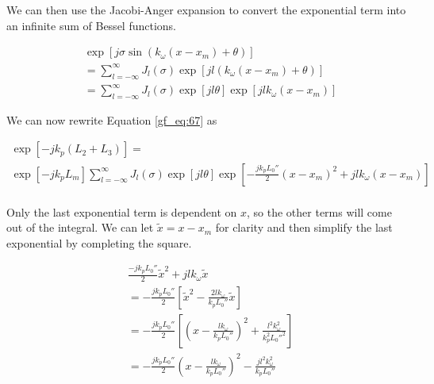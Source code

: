 We can then use the Jacobi-Anger expansion \cite{gbur_math} to convert the exponential term into an infinite sum of Bessel functions.

\begin{equation}
\begin{aligned}
& \exp\left[j\sigma \sin\left(k_{\omega} (x-x_m) + \theta\right) \right] \\ &=\sum_{l=-\infty}^{\infty}J_l(\sigma)\exp\left[jl(k_{\omega}(x-x_m) + \theta) \right] \\
&=\sum_{l=-\infty}^{\infty}J_l(\sigma)\exp\left[jl\theta\right]\exp\left[jlk_{\omega}(x-x_m)\right] 
\end{aligned}
\label{gf_eq:70}
\end{equation}
\renewcommand{\baselinestretch}{2} \small\normalsize

\noindent We can now rewrite Equation \ref{gf_eq:67} as

\begin{equation}
\begin{gathered}
\exp\left[-jk_p\left( L_2 + L_3\right) \right]= \\
\exp\left[-jk_pL_m\right]\sum_{l=-\infty}^{\infty}J_l(\sigma)\exp\left[jl\theta\right]
\exp\left[-\frac{jk_pL_0''}{2}(x-x_m)^2+jlk_{\omega}(x-x_m)\right]\\
\label{gf_eq:98}
\end{gathered}
\end{equation}
\renewcommand{\baselinestretch}{2} \small\normalsize

Only the last exponential term is dependent on $x$, so the other terms will come out of the integral. We can let $\tilde{x} = x-x_m$ for clarity and then simplify the last exponential by completing the square.

\begin{equation}
\begin{aligned}
&\frac{-jk_pL_0''}{2}\tilde{x}^2+jlk_{\omega}\tilde{x}\\
&=-\frac{jk_pL_0''}{2}\left[\tilde{x}^2 - \frac{2lk_{\omega}}{k_pL_0''}\tilde{x} \right]\\
&=-\frac{jk_pL_0''}{2}\left[\left(x-\frac{lk_{\omega}}{k_pL_0''} \right)^2 + \frac{l^2k_{\omega}^2}{k_p^2L_0''^2} \right]\\
&=-\frac{jk_pL_0''}{2}\left(x-\frac{lk_{\omega}}{k_pL_0''} \right)^2 - \frac{jl^2k_{\omega}^2}{k_pL_0''} 
\label{gf_eq:99}
\end{aligned}
\end{equation}
\renewcommand{\baselinestretch}{2} \small\normalsize

